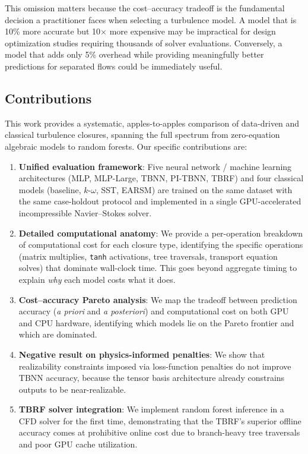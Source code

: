 This omission matters because the cost--accuracy tradeoff is the fundamental decision a practitioner faces when selecting a turbulence model.
A model that is 10\% more accurate but 10$\times$ more expensive may be impractical for design optimization studies requiring thousands of solver evaluations.
Conversely, a model that adds only 5\% overhead while providing meaningfully better predictions for separated flows could be immediately useful.

\subsection{Contributions}

This work provides a systematic, apples-to-apples comparison of data-driven and classical turbulence closures, spanning the full spectrum from zero-equation algebraic models to random forests. Our specific contributions are:

\begin{enumerate}
    \item \textbf{Unified evaluation framework}: Five neural network / machine learning architectures (MLP, MLP-Large, TBNN, PI-TBNN, TBRF) and four classical models (baseline, $k$-$\omega$, SST, EARSM) are trained on the same dataset \citep{McConkey2021} with the same case-holdout protocol and implemented in a single GPU-accelerated incompressible Navier--Stokes solver.

    \item \textbf{Detailed computational anatomy}: We provide a per-operation breakdown of computational cost for each closure type, identifying the specific operations (matrix multiplies, \texttt{tanh} activations, tree traversals, transport equation solves) that dominate wall-clock time. This goes beyond aggregate timing to explain \emph{why} each model costs what it does.

    \item \textbf{Cost--accuracy Pareto analysis}: We map the tradeoff between prediction accuracy (\emph{a priori} and \emph{a posteriori}) and computational cost on both GPU and CPU hardware, identifying which models lie on the Pareto frontier and which are dominated.

    \item \textbf{Negative result on physics-informed penalties}: We show that realizability constraints imposed via loss-function penalties do not improve TBNN accuracy, because the tensor basis architecture already constrains outputs to be near-realizable.

    \item \textbf{TBRF solver integration}: We implement random forest inference in a CFD solver for the first time, demonstrating that the TBRF's superior offline accuracy comes at prohibitive online cost due to branch-heavy tree traversals and poor GPU cache utilization.
\end{enumerate}

